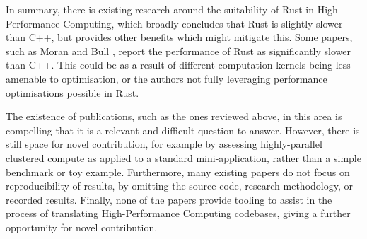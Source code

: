 In summary, there is existing research around the suitability of Rust in High-Performance Computing, which broadly concludes that Rust is slightly slower than C++, but provides other benefits which might mitigate this. Some papers, such as Moran and Bull \cite{moranEmergingTechnologiesRust2023}, report the performance of Rust as significantly slower than C++. This could be as a result of different computation kernels being less amenable to optimisation, or the authors not fully leveraging performance optimisations possible in Rust.

The existence of publications, such as the ones reviewed above, in this area is compelling that it is a relevant and difficult question to answer. However, there is still space for novel contribution, for example by assessing highly-parallel clustered compute as applied to a standard mini-application, rather than a simple benchmark or toy example. Furthermore, many existing papers do not focus on reproducibility of results, by omitting the source code, research methodology, or recorded results. Finally, none of the papers provide tooling to assist in the process of translating High-Performance Computing codebases, giving a further opportunity for novel contribution.























